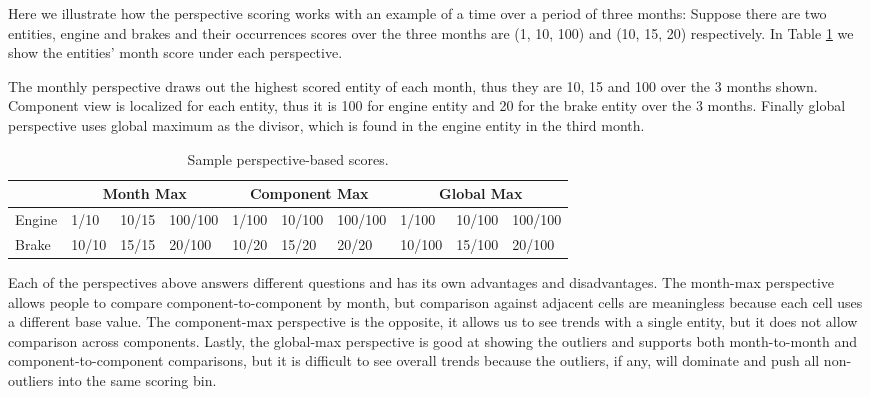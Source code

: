 Here we illustrate how the perspective scoring works with an example of a time
over a period of three months: Suppose there are two entities, engine and brakes
and their occurrences scores over the three months are (1, 10, 100) and (10, 15,
20) respectively. In Table \ref{table:perspective} we show the entities' month
score under each perspective.

The monthly perspective draws out the
highest scored entity of each month, thus they are 10, 15 and 100 over the 3
months shown. Component view is localized for each entity, thus it is 100 for
engine entity and 20 for the brake entity over the 3 months. Finally global
perspective uses global maximum as the divisor, which is found in the engine
entity in the third month.
 
    \begin{table}[h]
	\begin{tabular}{| l | lll | lll | lll | 
	      } 
	   \hline
	   & \multicolumn{3}{|c|}{Month Max} 
	   & \multicolumn{3}{|c|}{Component Max} 
	   & \multicolumn{3}{|c|}{Global Max} \\
	   
	   \hline
	   Engine & %
	            1/10 & 10/15 & 100/100 &      %
	            1/100 & 10/100 & 100/100 &    %
	            1/100 & 10/100 & 100/100 \\   %
	            
	   Brake &  %
	            10/10 & 15/15 & 20/100 &      %
	            10/20 & 15/20 & 20/20  &      %
	            10/100 & 15/100 & 20/100 \\   %
	   \hline
	\end{tabular} 
	\caption[Sample Perspective-based Scores.]{Sample perspective-based scores.} 
	\label{table:perspective}
	\end{table}
  
Each of the perspectives above answers different questions and has its own
advantages and disadvantages. The month-max perspective allows people to compare 
component-to-component by month, but comparison against adjacent cells are 
meaningless because each cell uses a different base value. The component-max 
perspective is the opposite, it allows us to see trends with a single entity, 
but it does not allow comparison across components. Lastly, the global-max 
perspective is good at showing the outliers and supports both month-to-month 
and component-to-component comparisons, but it is difficult to see overall
trends because the outliers, if any, will dominate and push all non-outliers
into the same scoring bin.

